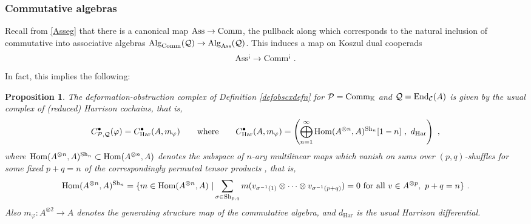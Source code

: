 \documentclass[11pt]{amsart}
\numberwithin{equation}{section}
\newtheorem{prop}[theo]{Proposition}
\theoremstyle{definition}
\newcommand{\bb}{\mathbb}
\newcommand{\mc}{\mathcal}
\newcommand{\SH}{{\textup{Sh}}}
\DeclareMathOperator{\Hom}{Hom}
\newcommand{\K}{{\bb K}}
\newcommand{\End}{{\textup{End}}}
\newcommand{\Alg}{{\textup{Alg}}}
\newcommand{\Comm}{{\textup{Comm}}}
\newcommand{\ash}{{\textup{\mbox{!`}}}}
\newcommand{\Ass}{{\textup{Ass}}}
\newcommand{\0}{{\textbf{0}}}
\begin{document}
\subsubsection{Commutative algebras} 
Recall from \ref{Asseg} that there is a canonical map $\Ass \to \Comm$, the pullback along which corresponds to the natural inclusion of commutative into associative algebras $\Alg_\Comm(\mc Q)\to \Alg_\Ass(\mc Q)$. This induces a map on Koszul dual cooperads 
\[
\Ass^\ash \to \Comm^\ash~.
\]
In fact, this implies the following:

\begin{prop}\label{Harcxprop}
	The deformation-obstruction complex of Definition \ref{defobscxdefn} for $\mc P=\Comm_\K$ and $\mc Q=\End_{\mc C}(A)$ is given by the usual complex of (reduced) Harrison cochains, that is,
	\[ 
	C^\bullet_{\mc P,\mc Q}(\varphi) = C^\bullet_{\textup{Har}}(A,m_\varphi) \qquad \text{where}\qquad C^\bullet_{\textup{Har}}(A,m_\varphi) = \left( \bigoplus_{n=1}^\infty \Hom(A^{\otimes n}, A)^{\SH_n}[1-n] \ , \ d_\textup{Har} \right)  \ , 
	\]
	where $\Hom(A^{\otimes n}, A)^{\SH_n}\subset\Hom(A^{\otimes n}, A)$ denotes the subspace of $n$-ary multilinear maps which vanish on sums over $(p,q)$-shuffles for some fixed $p+q=n$ of the correspondingly permuted tensor products 
	, that is,
	\[
	\Hom(A^{\otimes n},A) ^{\SH_n} = \{ m\in \Hom(A^{\otimes n},A)\ | \sum_{\sigma \in \SH_{p,q}} m(v_{\sigma^{-1}(1)}\otimes\dots\otimes v_{\sigma^{-1}(p+q)}) =0 \text{ for all } v\in A^{\otimes p},\  p+q=n \}~.
	\]
 Also $m_\varphi:A^{\otimes 2} \to A$ denotes the generating structure map of the commutative algebra, and $d_\text{Har}$ is the usual Harrison differential.

\end{prop}
\end{document}
